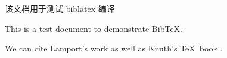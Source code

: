 \documentclass[twoside]{article}
\begin{document}
该文档用于测试 biblatex 编译

This is a test document to demonstrate BibTeX.

We can cite Lamport's work \cite{lamport1986latex} as well as Knuth's \TeX~book \cite{knuth1986texbook}.




\end{document}
